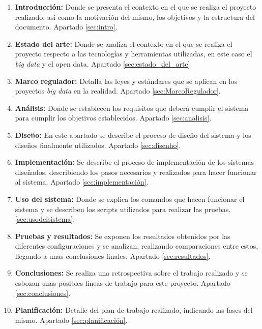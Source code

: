 \begin{enumerate}
\item \textbf{Introducción:} Donde se presenta el contexto en el que se realiza el proyecto realizado, así como la motivación del mismo, los objetivos y la estructura del documento. Apartado \ref{sec:intro}.

\item \textbf{Estado del arte:} Donde se analiza el contexto en el que se realiza el proyecto respecto a las tecnologías y herramientas utilizadas, en este caso el \textit{big data} y el open data. Apartado \ref{sec:estado_del_arte}.

\item \textbf{Marco regulador:} Detalla las leyes y estándares que se aplican en los proyectos \textit{big data} en la realidad. Apartado \ref{sec:MarcoRegulador}.

\item \textbf{Análisis:} Donde se establecen los requisitos que deberá cumplir el sistema para cumplir los objetivos establecidos. Apartado \ref{sec:analisis}.

\item \textbf{Diseño:} En este apartado se describe el proceso de diseño del sistema y los diseños finalmente utilizados. Apartado \ref{sec:disenho}.

\item \textbf{Implementación:} Se describe el proceso de implementación de los sistemas diseñados, describiendo los pasos necesarios y realizados para hacer funcionar al sistema. Apartado \ref{sec:implementación}.

\item \textbf{Uso del sistema:} Donde se explica los comandos que hacen funcionar el sistema y se describen los scripts utilizados para realizar las pruebas. \ref{sec:usodelsistema}.

\item \textbf{Pruebas y resultados:} Se exponen los resultados obtenidos por las diferentes configuraciones y se analizan, realizando comparaciones entre estos, llegando a unas conclusiones finales. Apartado \ref{sec:resultados}.

\item \textbf{Conclusiones:} Se realiza una retrospectiva sobre el trabajo realizado y se esbozan unas posibles líneas de trabajo para este proyecto. Apartado \ref{sec:conclusiones}.

\item \textbf{Planificación:} Detalle del plan de trabajo realizado, indicando las fases del mismo. Apartado \ref{sec:planificación}.


\end{enumerate}
